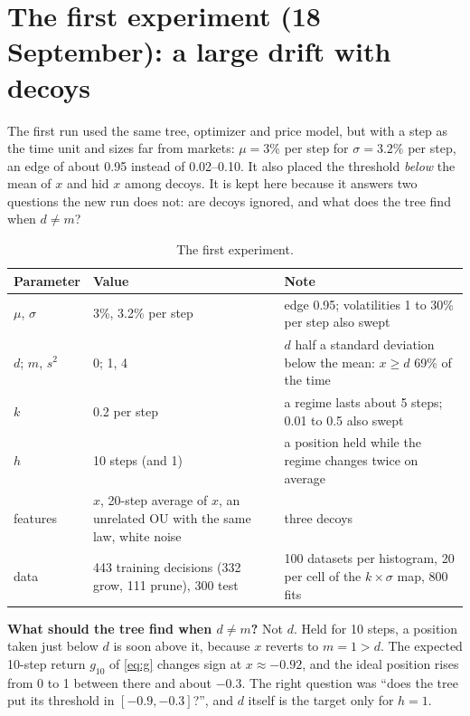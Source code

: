 \documentclass[11pt,a4paper]{article}
\newcommand{\1}{\mathbf{1}}
\begin{document}
\section{The first experiment (18 September): a large drift with decoys}\label{sec:first}
The first run used the same tree, optimizer and price model, but with a step as the time unit and sizes far from markets: $\mu=3\%$ per step for $\sigma=3.2\%$ per step, an edge of about 0.95 instead of 0.02--0.10. It also placed the threshold \emph{below} the mean of $x$ and hid $x$ among decoys. It is kept here because it answers two questions the new run does not: are decoys ignored, and what does the tree find when $d\neq m$?
\begin{table}[H]
\centering\small
\begin{tabularx}{\linewidth}{@{}l L L@{}}
\toprule
Parameter & Value & Note\\
\midrule
$\mu$, $\sigma$ & 3\%, 3.2\% per step & edge 0.95; volatilities 1 to 30\% per step also swept\\
$d$; $m$, $s^2$ & 0; 1, 4 & $d$ half a standard deviation below the mean: $x\ge d$ 69\% of the time\\
$k$ & 0.2 per step & a regime lasts about 5 steps; 0.01 to 0.5 also swept\\
$h$ & 10 steps (and 1) & a position held while the regime changes twice on average\\
features & $x$, 20-step average of $x$, an unrelated OU with the same law, white noise & three decoys\\
data & 443 training decisions (332 grow, 111 prune), 300 test & 100 datasets per histogram, 20 per cell of the $k\times\sigma$ map, 800 fits\\
\bottomrule
\end{tabularx}
\caption{The first experiment.}
\end{table}
\textbf{What should the tree find when $d\neq m$?} Not $d$. Held for 10 steps, a position taken just below $d$ is soon above it, because $x$ reverts to $m=1>d$. The expected 10-step return $g_{10}$ of \eqref{eq:g} changes sign at $x\approx-0.92$, and the ideal position rises from 0 to 1 between there and about $-0.3$. The right question was ``does the tree put its threshold in $[-0.9,-0.3]$?'', and $d$ itself is the target only for $h=1$.
\end{document}
